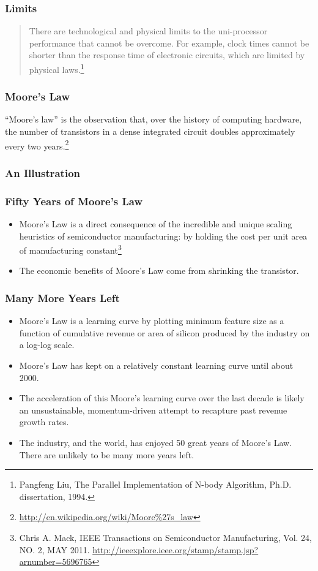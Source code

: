 \documentclass{beamer}
\begin{document}
\begin{CJK}{UTF8}{bsmi}
  \begin{frame}
    \frametitle{Limits}
    \begin{quote}
      There are technological and physical limits to the uni-processor
      performance that cannot be overcome.  For example, clock times
      cannot be shorter than the response time of electronic circuits,
      which are limited by physical laws.\footnote{Pangfeng Liu, The
        Parallel Implementation of N-body Algorithm,
        Ph.D. dissertation, 1994.}
    \end{quote}
  \end{frame}

  \begin{frame}
    \frametitle{Moore's Law}
    ``Moore's law'' is the observation that, over the history of computing
    hardware, the number of transistors in a dense integrated circuit
    doubles approximately every two
    years.\footnote{\url{http://en.wikipedia.org/wiki/Moore\%27s_law}}
  \end{frame}

  \begin{frame}
    \frametitle{An Illustration}
    \centerline{}
  \end{frame}

  \begin{frame}
    \frametitle{Fifty Years of Moore's Law}
    \begin{itemize}
    \item Moore's Law is a direct consequence of the incredible and
      unique scaling heuristics of semiconductor manufacturing: by
      holding the cost per unit area of manufacturing
      constant\footnote{Chris A. Mack, IEEE Transactions on
        Semiconductor Manufacturing, Vol. 24, NO. 2, MAY 2011.
        \url{http://ieeexplore.ieee.org/stamp/stamp.jsp?arnumber=5696765}}
    \item The economic benefits of Moore's Law come from shrinking the
      transistor.
    \end{itemize}
  \end{frame}

\begin{frame}
\frametitle{Many More Years Left}
   \begin{itemize}
    \item Moore's Law is a learning curve by plotting minimum feature
      size as a function of cumulative revenue or area of silicon
      produced by the industry on a log-log scale.
    \item Moore's Law has kept on a relatively constant learning curve
      until about 2000.
    \item The acceleration of this Moore's learning curve over the
      last decade is likely an unsustainable, momentum-driven
      attempt to recapture past revenue growth rates.
    \item The industry, and the world, has enjoyed 50 great years of
      Moore's Law. There are unlikely to be many more years
      left.
   \end{itemize}
\end{frame}


\end{CJK}
\end{document}
